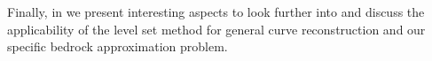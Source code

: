 Finally, in  we present interesting aspects to look further into and discuss the applicability of the level set method for general curve reconstruction and our specific bedrock approximation problem.
%
\begin{comment}
** How can this theory be applied in the real world?

** What are the strengths and weaknesses?

** How is this thesis structured?

** Further work



From an unstructured set of points, $V$, we want to find a closed surface that approaches the point set as closely as possible while also requiring some extent of smoothness. Such a method could be useful when the surface can not be directly observed, but only measured pointwise. An example of this could be modelling geological formations underground or ...

From realistic samples the data would be susceptible to measurement errors and thus a model should be able to handle noisy point sets. However, for the resulting surface to make any sense, the points should not be arbitrarily distributed in the domain, but follow some pattern resembling a surface.

There are several approaches to construct methods solving this problem. *Use this section, or maybe more? To sum up and explain weaknesses and strengths of these approaches.

In this thesis, we consider a PDE-driven approach to form a surface approximating the point set. Here, a surface, or a front, moves with a speed that is dependent on the distance to the point set in addition to the smoothness of the curve in that point. In contrast to a surface tracking procedure, where we start with an initial curve, discretise it and track the movement of the surface points, we will use an approach called a \textit{level set method}. This method describes the surface as an iso-curve of a higher dimensional functional defined on the entire domain. 

The level set method would use more computational power compared to a front tracking method because it also considers the environment around the front/surface. Fortunately the computational costs also comes with increased flexibility. The front tracking approach suffers from some shortcomings when it comes to topological changes like collisions or splitting of surfaces. In addition, front tracking techniques would not be able to model  appearing or disappearing surfaces. Using an implicit definition of the surface using iso-curves of a higher dimensional functional, none if these issues would cause problems. 
\end{comment}



 
